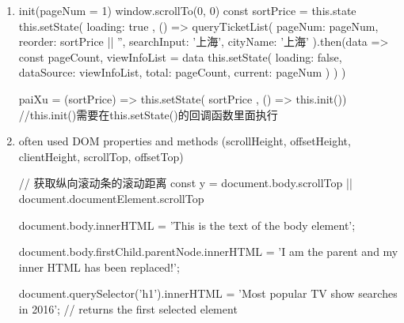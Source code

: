 \documentclass[a4paper,12pt]{article}
\begin{document}
\begin{enumerate}

\item 
\begin{jscode}
init(pageNum = 1) {
	window.scrollTo(0, 0)
	const { sortPrice } = this.state
	this.setState({
		loading: true
	}, () => {
		queryTicketList({
			pageNum: pageNum,
			reorder: sortPrice || '',
			searchInput: '上海',
			cityName: '上海'
		}).then(data => {
			const { pageCount, viewInfoList } = data
			this.setState({
				loading: false,
				dataSource: viewInfoList,
				total: pageCount,
				current: pageNum
			})
		})
	})
}

paiXu = (sortPrice) => {
	this.setState({ sortPrice }, () => this.init())  //this.init()需要在this.setState()的回调函数里面执行
}
\end{jscode}

\item often used DOM properties and methods (scrollHeight, offsetHeight, clientHeight, scrollTop, offsetTop)
\begin{jscode}
// 获取纵向滚动条的滚动距离
const y = document.body.scrollTop || document.documentElement.scrollTop

document.body.innerHTML = 'This is the text of the body element';

document.body.firstChild.parentNode.innerHTML = 'I am the parent and my inner HTML has been replaced!';

document.querySelector('h1').innerHTML = 'Most popular TV show searches in 2016'; // returns the first selected element


\end{jscode}
\end{enumerate}
\end{document}
